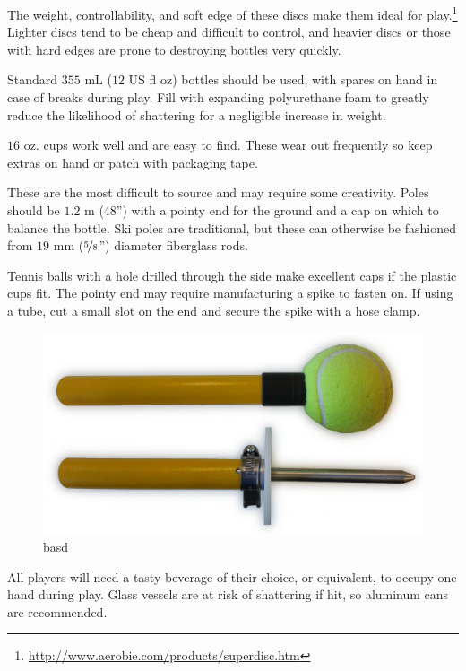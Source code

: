 \documentclass[11pt,letterpaper,twocolumn,english,DIV=calc]{scrartcl}
\begin{document}
\begin{description}[font=\large, leftmargin=0.5em]
	\item [{Aerobie® Superdisc™:}] 
		The weight, controllability, and soft edge of these discs make them ideal for play.\footnote{\url{http://www.aerobie.com/products/superdisc.htm}} 
		Lighter discs tend to be cheap and difficult to control, and heavier discs or those with hard edges are prone to destroying bottles very quickly. 
	\item [{Empty bottles (2):}] 
		Standard $355\mbox{ mL}$ ($12$ US fl oz) bottles should be used, with spares on hand in case of breaks during play.
		Fill with expanding polyurethane foam to greatly reduce the likelihood of shattering for a negligible increase in weight. 
	\item [{Plastic cups (2):}] 
		$16\mbox{ oz.}$ cups work well and are easy to find. 
		These wear out frequently so keep extras on hand or patch with packaging tape.
	\item [{Poles (2):}] 
		These are the most difficult to source and may require some creativity. 
		Poles should be $1.2\mbox{ m}$ (48'') with a pointy end for the ground and a cap on which to balance the bottle. 
		Ski poles are traditional, but these can otherwise be fashioned from $19\mbox{ mm}$ ($\nicefrac{5}{8}$'') diameter fiberglass rods. 

		Tennis balls with a hole drilled through the side make excellent caps if the plastic cups fit. 
		The pointy end may require manufacturing a spike to fasten on. 
		If using a tube, cut a small slot on the end and secure the spike with a hose clamp.

		\begin{figure}[!ht]
			\centering{}
			\includegraphics[width=0.8\columnwidth]{images/pole_ends-w}
			\caption{basd}
		\end{figure}

	\item [{Tasty~beverages:}] 
		All players will need a tasty beverage of their choice, or equivalent, to occupy one hand during play. 
		Glass vessels are at risk of shattering if hit, so aluminum cans are recommended. 
\end{description}
\end{document}
